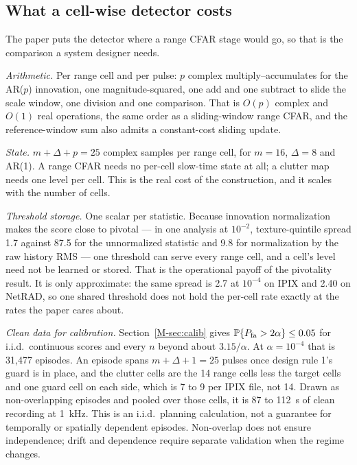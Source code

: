\documentclass[10pt]{article}
\newcommand{\PP}{\mathbb{P}}
\begin{document}
\subsection{What a cell-wise detector costs}\label{sup:cost}
The paper puts the detector where a range CFAR stage would go, so that is the comparison a
system designer needs.

\emph{Arithmetic.} Per range cell and per pulse: $p$ complex multiply--accumulates for the
AR($p$) innovation, one magnitude-squared, one add and one subtract to slide the scale window,
one division and one comparison. That is $O(p)$ complex and $O(1)$ real operations, the same
order as a sliding-window range CFAR, and the reference-window sum also admits a constant-cost sliding update.

\emph{State.} $m+\Delta+p=25$ complex samples per range cell, for $m=16$, $\Delta=8$ and
AR(1). A range CFAR needs no per-cell slow-time state at all; a clutter map needs one level per
cell. This is the real cost of the construction, and it scales with the number of cells.

\emph{Threshold storage.} One scalar per statistic. Because innovation normalization makes the
score close to pivotal --- in one analysis at $10^{-2}$, texture-quintile spread 1.7 against
87.5 for the unnormalized statistic and 9.8 for normalization by the raw history RMS --- one
threshold can serve every range cell, and a cell's level need not be learned or stored. That is
the operational payoff of the pivotality result. It is only approximate: the same spread is 2.7
at $10^{-4}$ on IPIX and 2.40 on NetRAD, so one shared threshold does not hold the per-cell
rate exactly at the rates the paper cares about.

\emph{Clean data for calibration.} Section~\ref{M-sec:calib} gives
$\PP\{P_{\rm fa}>2\alpha\}\le0.05$ for i.i.d.\ continuous scores and every $n$ beyond about $3.15/\alpha$. At
$\alpha=10^{-4}$ that is 31{,}477 episodes. An episode spans $m+\Delta+1=25$ pulses
once design rule 1's guard is in place, and the clutter cells are the 14 range cells less the
target cells and one guard cell on each side, which is 7 to 9 per IPIX
file, not 14. Drawn as non-overlapping episodes and pooled over those cells, it is
87 to 112~s of clean recording at 1~kHz. This is an i.i.d.\ planning
calculation, not a guarantee for temporally or spatially dependent episodes. Non-overlap does
not ensure independence; drift and dependence require separate validation when the regime changes.
\end{document}
